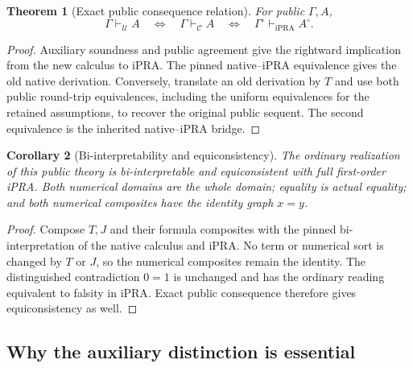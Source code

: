 \documentclass[11pt,letterpaper]{article}
\newtheorem{theorem}{Theorem}[section]
\newtheorem{corollary}[theorem]{Corollary}
\theoremstyle{definition}
\newcommand{\U}{\mathcal U}
\newcommand{\ipra}{\mathrm{iPRA}}
\begin{document}
\begin{theorem}[Exact public consequence relation]\label{thm:exact-public}
For public $\Gamma,A$,
\[
 \Gamma\vdash_{\U}A
 \quad\Longleftrightarrow\quad
 \Gamma\vdash_{\mathcal C}A
 \quad\Longleftrightarrow\quad
 \Gamma^\circ\vdash_{\ipra}A^\circ.
\]
\end{theorem}
\begin{proof}
Auxiliary soundness and public agreement give the rightward implication
from the new calculus to iPRA.  The pinned native--iPRA equivalence gives
the old native derivation.  Conversely, translate an old derivation by
$T$ and use both public round-trip equivalences, including the uniform
equivalences for the retained assumptions, to recover the original public
sequent.  The second equivalence is the inherited native--iPRA bridge.
\end{proof}

\begin{corollary}[Bi-interpretability and equiconsistency]
The ordinary realization of this public theory is bi-interpretable and
equiconsistent with full first-order iPRA.  Both numerical domains are the
whole domain; equality is actual equality; and both numerical composites
have the identity graph $x=y$.
\end{corollary}
\begin{proof}
Compose $T,J$ and their formula composites with the pinned
bi-interpretation of the native calculus and iPRA.  No term or numerical
sort is changed by $T$ or $J$, so the numerical composites remain the
identity.  The distinguished contradiction $0=1$ is unchanged and has
the ordinary reading equivalent to falsity in iPRA.  Exact public
consequence therefore gives equiconsistency as well.
\end{proof}

\subsection{Why the auxiliary distinction is essential}
\end{document}
